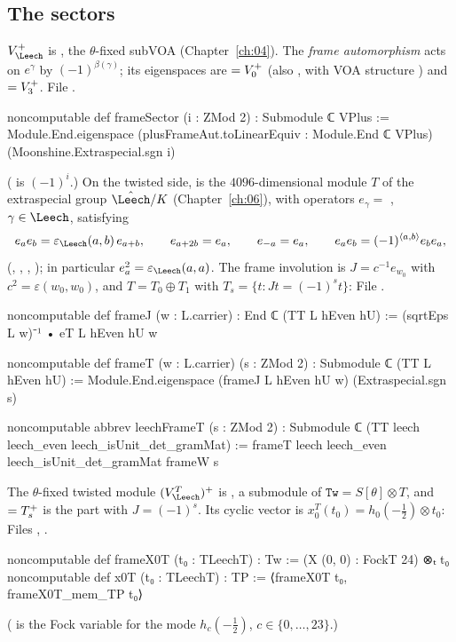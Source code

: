 \subsection{The sectors}
$V_\Leech^+$ is , the $\theta$-fixed subVOA (Chapter~\ref{ch:04}). The \emph{frame
automorphism}  acts on $e^\gamma$ by $(-1)^{\beta(\gamma)}$; its eigenspaces are
 $=V_0^{+}$ (also , with VOA structure ) and
 $=V_3^{+}$.
\noindent File .
\begin{leancode}
noncomputable def frameSector (i : ZMod 2) : Submodule ℂ VPlus :=
  Module.End.eigenspace (plusFrameAut.toLinearEquiv : Module.End ℂ VPlus)
    (Moonshine.Extraspecial.sgn i)
\end{leancode}
( is $(-1)^i$.) On the twisted side,  is the
$4096$-dimensional module $T$ of the extraspecial group $\hat\Leech/K$ (Chapter~\ref{ch:06}), with
operators $e_\gamma=$ , $\gamma\in\Leech$, satisfying
\begin{equation}\label{ch13:eq:Trel}
  e_a e_b=\varepsilon_\Leech(a,b)\,e_{a+b},\qquad e_{a+2b}=e_a,\qquad e_{-a}=e_a,
  \qquad e_a e_b=(-1)^{\langle a,b\rangle}e_b e_a,
\end{equation}
(, , , ); in particular
$e_a^2=\varepsilon_\Leech(a,a)$. The frame involution is $J=c^{-1}e_{w_0}$ with $c^2=\varepsilon(w_0,w_0)$,
and $T=T_0\oplus T_1$ with $T_s=\{t: Jt=(-1)^s t\}$:
\noindent File .
\begin{leancode}
noncomputable def frameJ (w : L.carrier) : End ℂ (TT L hEven hU) :=
  (sqrtEps L w)⁻¹ • eT L hEven hU w

noncomputable def frameT (w : L.carrier) (s : ZMod 2) : Submodule ℂ (TT L hEven hU) :=
  Module.End.eigenspace (frameJ L hEven hU w) (Extraspecial.sgn s)

noncomputable abbrev leechFrameT (s : ZMod 2) : Submodule ℂ (TT leech leech_even leech_isUnit_det_gramMat) :=
  frameT leech leech_even leech_isUnit_det_gramMat frameW s
\end{leancode}
The $\theta$-fixed twisted module $(V_\Leech^T)^+$ is , a submodule of
$\mathtt{Tw}=S[\theta]\otimes T$, and  $=T_{s}^{+}$ is the part with
$J=(-1)^s$. Its cyclic vector is $x_0^T(t_0)=h_0(-\tfrac12)\otimes t_0$:
\noindent Files , .
\begin{leancode}
noncomputable def frameX0T (t₀ : TLeechT) : Tw := (X (0, 0) : FockT 24) ⊗ₜ t₀
noncomputable def x0T (t₀ : TLeechT) : TP := ⟨frameX0T t₀, frameX0T_mem_TP t₀⟩
\end{leancode}
( is the Fock variable for the mode $h_c(-\tfrac12)$, $c\in\{0,\dots,23\}$.)

